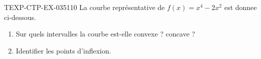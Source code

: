 \begin{exercice}{TEXP-CTP-EX-035}{1}{10}
La courbe représentative de $f(x) = x^4 - 2x^2$ est donnee ci-dessous.
\begin{enumerate}
  \item Sur quels intervalles la courbe est-elle convexe ? concave ?
  \item Identifier les points d'inflexion.
\end{enumerate}

\end{exercice}
